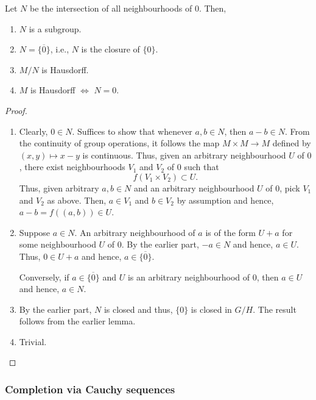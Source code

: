 \begin{lem} \label{lem:abelian-group-hausdorff}
	Let $N$ be the intersection of all neighbourhoods of $0$. Then,
	\begin{enumerate}
		\item $N$ is a subgroup.
		\item $N = \overline{\{0\}}$, i.e., $N$ is the closure of $\{0\}$.
		\item $M/N$ is Hausdorff.
		\item $M$ is Hausdorff $\Leftrightarrow$ $N = 0$.
	\end{enumerate}
\end{lem}
\begin{proof} 
	\phantom{hi}
	\begin{enumerate}
		\item Clearly, $0 \in N$. Suffices to show that whenever $a, b \in N$, then $a - b \in N$. From the continuity of group operations, it follows the map $M \times M \to M$ defined by $(x, y) \mapsto x - y$ is continuous. Thus, given an arbitrary neighbourhood $U$ of $0$, there exist neighbourhoods $V_{1}$ and $V_{2}$ of $0$ such that
		\begin{equation*} 
			f(V_{1} \times V_{2}) \subset U.
		\end{equation*}
		Thus, given arbitrary $a, b \in N$ and an arbitrary neighbourhood $U$ of $0$, pick $V_{1}$ and $V_{2}$ as above. Then, $a \in V_{1}$ and $b \in V_{2}$ by assumption and hence, $a - b = f((a, b)) \in U$.
		\item Suppose $a \in N$. An arbitrary neighbourhood of $a$ is of the form $U + a$ for some neighbourhood $U$ of $0$. By the earlier part, $-a \in N$ and hence, $a \in U$. Thus, $0 \in U + a$ and hence, $a \in \overline{\{0\}}$. 

		Conversely, if $a \in \overline{\{0\}}$ and $U$ is an arbitrary neighbourhood of $0$, then $a \in U$ and hence, $a \in N$.
		\item By the earlier part, $N$ is closed and thus, $\{0\}$ is closed in $G/H$. The result follows from the earlier lemma.
		\item Trivial. \qedhere
	\end{enumerate}
\end{proof}

\subsubsection{Completion via Cauchy sequences} \label{subsubsec:completion-cauchy}

